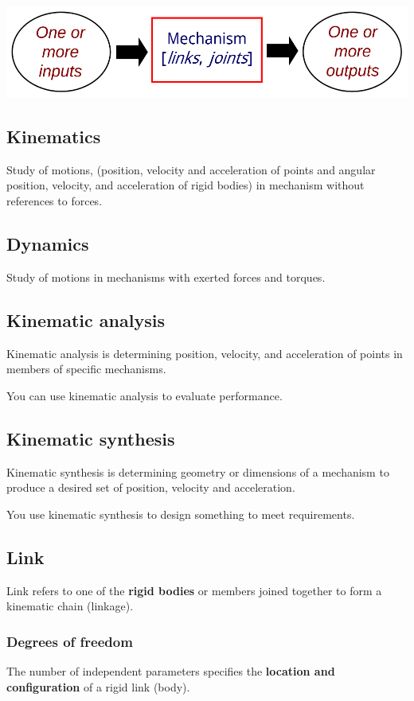 \documentclass[11pt]{article}
\begin{document}
\begin{center}
\includegraphics[width=.9\linewidth]{./images/mechanism-flow-chart.png}
\end{center}
\subsection{Kinematics}
\label{sec:org605a1b3}
Study of motions, (position, velocity and acceleration of points and angular position, velocity, and acceleration of rigid bodies) in mechanism without references to forces.
\subsection{Dynamics}
\label{sec:org788f399}
Study of motions in mechanisms with exerted forces and torques.
\subsection{Kinematic analysis}
\label{sec:org1295ef2}
Kinematic analysis is determining position, velocity, and acceleration of points in members of specific mechanisms.

You can use kinematic analysis to evaluate performance.
\subsection{Kinematic synthesis}
\label{sec:org20d47a5}
Kinematic synthesis is determining geometry or dimensions of a mechanism to produce a desired set of position, velocity and acceleration.

You use kinematic synthesis to design something to meet requirements.
\subsection{Link}
\label{sec:orgc968c8f}
Link refers to one of the \textbf{rigid bodies} or members joined together to form a kinematic chain (linkage).

 \newpage
\subsubsection{Degrees of freedom}
\label{sec:org7e594a2}
The number of independent parameters specifies the \textbf{location and configuration} of a rigid link (body).
\end{document}
